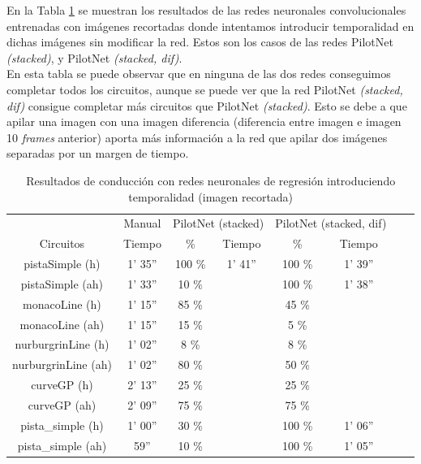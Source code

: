 En la Tabla \ref{resultados_regresion_temporal_recortada} se muestran los resultados de las redes neuronales convolucionales entrenadas con imágenes recortadas donde intentamos introducir temporalidad en dichas imágenes sin modificar la red. Estos son los casos de las redes PilotNet \textit{(stacked)}, y PilotNet \textit{(stacked, dif)}.\\

En esta tabla se puede observar que en ninguna de las dos redes conseguimos completar todos los circuitos, aunque se puede ver que la red PilotNet \textit{(stacked, dif)} consigue completar más circuitos que  PilotNet \textit{(stacked)}. Esto se debe a que apilar una imagen con una imagen diferencia (diferencia entre imagen e imagen 10 \textit{frames} anterior) aporta más información a la red que apilar dos imágenes separadas por un margen de tiempo.\\

\begin{table}[H]
\centering
\caption{Resultados de conducción con redes neuronales de regresión introduciendo temporalidad (imagen recortada)}
\label{resultados_regresion_temporal_recortada}
\begin{tabular}{c|c|c|c|c|c|c|c|}
\cline{2-6}
                          & \multicolumn{1}{c|}{Manual} & \multicolumn{2}{c|}{PilotNet (stacked)} & \multicolumn{2}{c|}{PilotNet (stacked, dif)} \\ \cline{1-6} 
                        \multicolumn{1}{|c|}{Circuitos}    & Tiempo       & \%       & Tiempo       & \%        & Tiempo      \\ \hline
\multicolumn{1}{|c|}{pistaSimple (h)}    & 1' 35''     & 100 \%   & 1' 41''    & 100 \%   & 1' 39''          \\ \hline
\multicolumn{1}{|c|}{pistaSimple (ah)}     & 1' 33''           & 10 \%        &        & 100 \%     & 1' 38''   \\ \hline
\multicolumn{1}{|c|}{monacoLine (h)}      & 1' 15''           & 85 \%         &        & 45 \%       &            \\ \hline
\multicolumn{1}{|c|}{monacoLine (ah)}       & 1' 15''       & 15 \%       &         & 5 \%           &         \\ \hline
\multicolumn{1}{|c|}{nurburgrinLine (h)}      & 1' 02''       & 8 \%      &       & 8 \%        &        \\ \hline
\multicolumn{1}{|c|}{nurburgrinLine (ah)}       & 1' 02''     & 80 \%     &        & 50 \%     &          \\ \hline
\multicolumn{1}{|c|}{curveGP (h)}     & 2' 13''     & 25 \%       &     & 25 \%     &              \\ \hline
\multicolumn{1}{|c|}{curveGP (ah)}       & 2' 09''            & 75 \%    &     & 75 \%       &       \\ \hline
\multicolumn{1}{|c|}{pista\_simple (h)}       & 1' 00''           & 30 \%       &       & 100 \%      & 1' 06''    \\ \hline
\multicolumn{1}{|c|}{pista\_simple (ah)}     & 59''    & 10 \%    &          & 100 \%      & 1' 05''          \\ \hline
\end{tabular}
\end{table}

